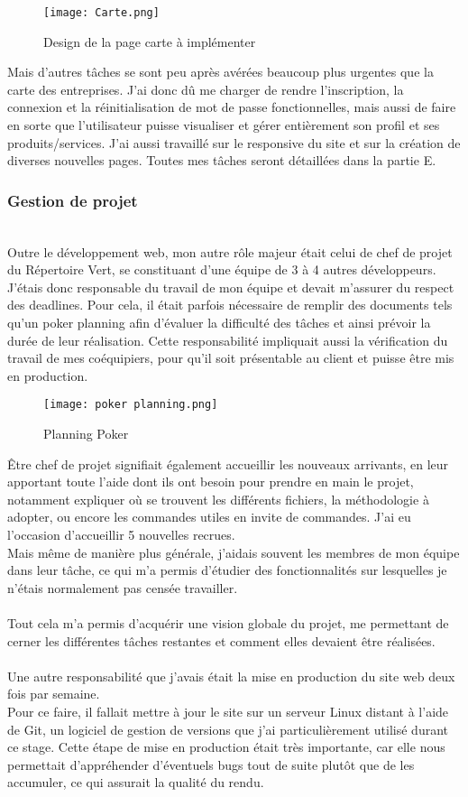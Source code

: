 \begin{figure}[H]
    \centering
    \texttt{[image: Carte.png]}
    \caption{Design de la page carte à implémenter}
\end{figure}


Mais d'autres tâches se sont peu après avérées beaucoup plus urgentes que la carte des entreprises. J'ai donc dû me charger de rendre l'inscription, la connexion et la réinitialisation de mot de passe fonctionnelles, 
mais aussi de faire en sorte que l'utilisateur puisse visualiser et gérer entièrement son profil et ses produits/services. J'ai aussi travaillé sur le responsive du site et sur la création de diverses nouvelles pages. Toutes mes tâches seront détaillées dans la partie E.

\subsubsection{Gestion de projet}
~\\
Outre le développement web, mon autre rôle majeur était celui de chef de projet du Répertoire Vert, se constituant d'une équipe de 3 à 4 autres développeurs.
J'étais donc responsable du travail de mon équipe et devait m'assurer du respect des deadlines. Pour cela, il était parfois nécessaire de remplir des documents tels qu'un poker planning afin d'évaluer la difficulté des tâches et ainsi prévoir la durée de leur réalisation.
Cette responsabilité impliquait aussi la vérification du travail de mes coéquipiers, pour qu'il soit présentable au client et puisse être mis en production.
\begin{figure}[H]
    \centering
    \texttt{[image: poker planning.png]}
    \caption{Planning Poker}
\end{figure}

Être chef de projet signifiait également accueillir les nouveaux arrivants, en leur apportant toute l'aide dont ils ont besoin pour prendre en main le projet, notamment expliquer où se trouvent les différents fichiers, la méthodologie à adopter, ou encore les commandes utiles en invite de commandes. J'ai eu l'occasion d'accueillir 5 nouvelles recrues.
\\Mais même de manière plus générale, j'aidais souvent les membres de mon équipe dans leur tâche, ce qui m'a permis d'étudier des fonctionnalités sur lesquelles je n'étais normalement pas censée travailler.
\\\\
Tout cela m'a permis d'acquérir une vision globale du projet, me permettant de cerner les différentes tâches restantes et comment elles devaient être réalisées.
\\\\
Une autre responsabilité que j'avais était la mise en production du site web deux fois par semaine. 
\\Pour ce faire, il fallait mettre à jour le site sur un serveur Linux distant à l'aide de Git, un logiciel de gestion de versions que j'ai particulièrement utilisé durant ce stage. Cette étape de mise en production était très importante, car elle nous permettait d'appréhender d'éventuels bugs tout de suite plutôt que de les accumuler, ce qui assurait la qualité du rendu.


